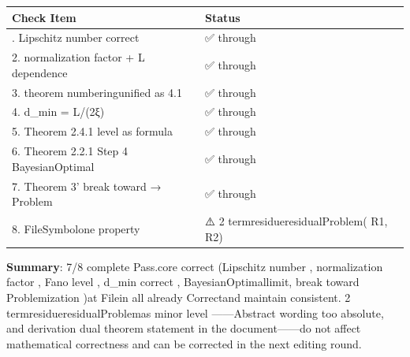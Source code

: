 \documentclass[
  12pt,
]{article}
\begin{document}
\begin{longtable}[]{@{}ll@{}}
\toprule\noalign{}
Check Item & Status \\
\midrule\noalign{}
\endhead
\bottomrule\noalign{}
\endlastfoot
1. Lipschitz number correct  & ✅ through  \\
2. normalization factor  +  L dependence & ✅ through  \\
3. theorem numberingunified as  4.1 & ✅ through  \\
4. d\_min = L/(2ξ) & ✅ through  \\
5. Theorem 2.4.1 level as formula  & ✅ through  \\
6. Theorem 2.2.1 Step 4 BayesianOptimal & ✅ through  \\
7. Theorem 3' break toward  → Problem & ✅ through  \\
8. FileSymbolone property  & ⚠️ 2 termresidueresidualProblem(  R1, R2) \\
\end{longtable}

\textbf{Summary}: 7/8 complete Pass.core correct (Lipschitz
number , normalization factor , Fano level , d\_min
correct , BayesianOptimallimit, break toward Problemization )at Filein all already Correctand maintain consistent. 2
termresidueresidualProblemas  minor level ------Abstract wording too absolute, and derivation
dual theorem statement in the document------do not affect mathematical correctness and can be corrected in the next editing round.
\end{document}
